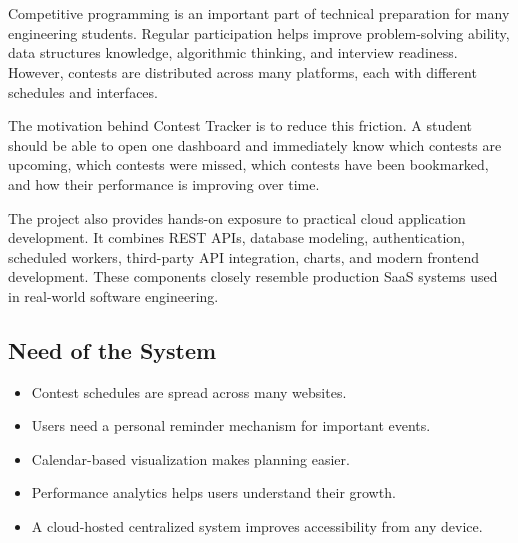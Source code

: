 \documentclass[12pt,a4paper]{report}
\begin{document}
\chapter{}
\begin{normalsize}

Competitive programming is an important part of technical preparation for many engineering students. Regular participation helps improve problem-solving ability, data structures knowledge, algorithmic thinking, and interview readiness. However, contests are distributed across many platforms, each with different schedules and interfaces.

\vspace{0.3cm}

\noindent
The motivation behind Contest Tracker is to reduce this friction. A student should be able to open one dashboard and immediately know which contests are upcoming, which contests were missed, which contests have been bookmarked, and how their performance is improving over time.

\vspace{0.3cm}

\noindent
The project also provides hands-on exposure to practical cloud application development. It combines REST APIs, database modeling, authentication, scheduled workers, third-party API integration, charts, and modern frontend development. These components closely resemble production SaaS systems used in real-world software engineering.

\section{Need of the System}

\begin{itemize}
    \item Contest schedules are spread across many websites.
    \item Users need a personal reminder mechanism for important events.
    \item Calendar-based visualization makes planning easier.
    \item Performance analytics helps users understand their growth.
    \item A cloud-hosted centralized system improves accessibility from any device.
\end{itemize}

\end{normalsize}
\end{document}
